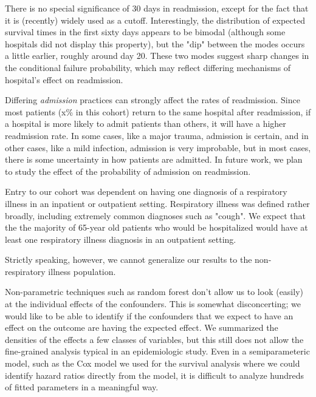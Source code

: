 \documentclass[]{article}\usepackage[]{graphicx}\usepackage[]{color}
\begin{document}
There is no special significance of 30 days in readmission, except for the fact that it is (recently) widely used as a cutoff. Interestingly, the distribution of expected survival times in the first sixty days appears to be bimodal (although some hospitals did not display this property), but the "dip" between the modes occurs a little earlier, roughly around day 20. These two modes suggest sharp changes in the conditional failure probability, which may reflect differing mechanisms of hospital's effect on readmission. 

Differing \emph{admission} practices can strongly affect the rates of readmission. Since most patients (x\% in this cohort) return to the same hospital after readmission, if a hospital is more likely to admit patients than others, it will have a higher readmission rate. In some cases, like a major trauma, admission is certain, and in other cases, like a mild infection, admission is very improbable, but in most cases, there is some uncertainty in how patients are admitted. In future work, we plan to study the effect of the probability of admission on readmission.

Entry to our cohort was dependent on having one diagnosis of a respiratory illness in an inpatient or outpatient setting. Respiratory illness was defined rather broadly, including extremely common diagnoses such as "cough". We expect that the the majority of 65-year old patients who would be hospitalized would have at least one respiratory illness diagnosis in an outpatient setting. 

Strictly speaking, however, we cannot generalize our results to the non-respiratory illness population. 

Non-parametric techniques such as random forest don't allow us to look (easily) at the individual effects of the confounders. This is somewhat disconcerting; we would like to be able to identify if the confounders that we expect to have an effect on the outcome are having the expected effect. We summarized the densities of the effects a few classes of variables, but this still does not allow the fine-grained analysis typical in an epidemiologic study. Even in a semiparameteric model, such as the Cox model we used for the survival analysis where we could identify hazard ratios directly from the model, it is difficult to analyze hundreds of fitted parameters in a meaningful way. 
\end{document}
